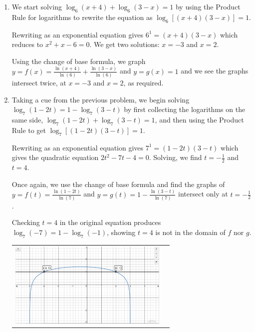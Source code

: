 \documentclass{ximera}
\begin{document}
\begin{ex}
\begin{enumerate}
\begin{center}
\end{center}


\item We  start solving $\log_{6}(x+4) + \log_{6}(3-x) = 1$ by using the Product Rule for logarithms to rewrite the equation as  $\log_{6}\left[(x+4)(3-x)\right] = 1$.  

\smallskip

Rewriting as an exponential equation gives $6^{1} = (x+4)(3-x)$ which reduces to $x^2+x-6 = 0$.  We get two solutions: $x=-3$ and $x=2$.   

\smallskip

Using the change of base formula, we graph  $y=f(x) =  \frac{\ln(x+4)}{\ln(6)} + \frac{\ln(3-x)}{\ln(6)}$ and $y=g(x) = 1$ and we see the graphs intersect twice, at $x=-3$ and $x=2$, as required.

\item  Taking a cue from the previous problem, we begin solving $\log_{7}(1-2t) = 1 - \log_{7}(3-t)$ by first collecting the logarithms on the same side, $\log_{7}(1-2t) +  \log_{7}(3-t) = 1$, and then using the Product Rule to get $\log_{7}[(1-2t)(3-t)] = 1$.  

\smallskip

Rewriting  as an exponential equation gives $7^{1} = (1-2t)(3-t)$ which gives the quadratic equation $2t^2-7t-4=0$.  Solving, we find  $t = -\frac{1}{2}$ and $t=4$.  

\smallskip

Once again, we use the change of base formula and find the graphs of  $y = f(t) = \frac{\ln(1-2t)}{\ln(7)}$ and $y=g(t) = 1 - \frac{\ln(3-t)}{\ln(7)}$ intersect only at $t=-\frac{1}{2}$.  

\smallskip

Checking $t=4$ in the original equation produces $\log_{7}(-7) = 1 - \log_{7}(-1)$, showing $t=4$ is not in the domain of $f$ nor $g$.

\begin{center}

\begin{tabular}{cc}

\includegraphics[width=3in]{./LogarithmicEquationsandInequalitiesGraphics/LogEqnEx03.jpg} &


\end{tabular}
\end{center}
\end{enumerate}
\end{ex}
\end{document}
